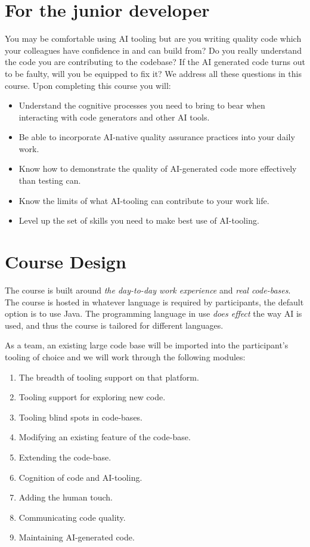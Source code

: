 \documentclass[twoside=false,DIV=14]{scrartcl}
\begin{document}
\section{For the junior developer}
You may be comfortable using AI tooling but are you writing quality code which your colleagues have confidence in and can build from?  Do you really understand the code you are contributing to the codebase?   If the AI generated code turns out to be faulty, will you be equipped to fix it?  We address all these questions in this course.  Upon completing this course you will:
\begin{itemize}
    \item Understand the cognitive processes you need to bring to bear when interacting with code generators and other AI tools.
    \item Be able to incorporate AI-native quality assurance practices into your daily work.
    \item Know how to demonstrate the quality of AI-generated code more effectively than testing can.
    \item Know the limits of what AI-tooling can contribute to your work life.
    \item Level up the set of skills you need to make best use of AI-tooling.
\end{itemize}

\section{Course Design}

The course is built around \emph{the day-to-day work experience} and \emph{real code-bases}.  The course is hosted in whatever language is required by participants, the default option is to use Java.  The programming language in use \emph{does effect} the way AI is used, and thus the course is tailored for different languages.

As a team, an existing large code base will be imported into the participant's tooling of choice and we will work through the following modules:
\begin{enumerate}
    \item The breadth of tooling support on that platform.
    \item Tooling support for exploring new code.
    \item Tooling blind spots in code-bases.
    \item Modifying an existing feature of the code-base.
    \item Extending the code-base.
    \item Cognition of code and AI-tooling.
    \item Adding the human touch.
    \item Communicating code quality.
    \item Maintaining AI-generated code.
\end{enumerate}
\end{document}

